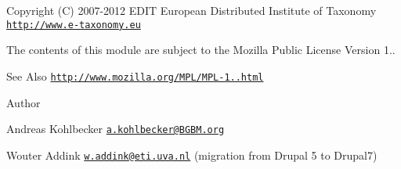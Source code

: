 \begin{DoxyCopyright}{Copyright}
(C) 2007-\/2012 E\-D\-I\-T European Distributed Institute of Taxonomy \href{http://www.e-taxonomy.eu}{\tt http\-://www.\-e-\/taxonomy.\-eu}
\end{DoxyCopyright}
The contents of this module are subject to the Mozilla Public License Version 1.. \begin{DoxySeeAlso}{See Also}
\href{http://www.mozilla.org/MPL/MPL-1.1.html}{\tt http\-://www.\-mozilla.\-org/\-M\-P\-L/\-M\-P\-L-\/1..\-html}
\end{DoxySeeAlso}
\begin{DoxyAuthor}{Author}

\begin{DoxyItemize}
\item Andreas Kohlbecker \href{mailto:a.kohlbecker@BGBM.org}{\tt a.\-kohlbecker@\-B\-G\-B\-M.\-org}
\item Wouter Addink \href{mailto:w.addink@eti.uva.nl}{\tt w.\-addink@eti.\-uva.\-nl} (migration from Drupal 5 to Drupal7) 
\end{DoxyItemize}
\end{DoxyAuthor}



